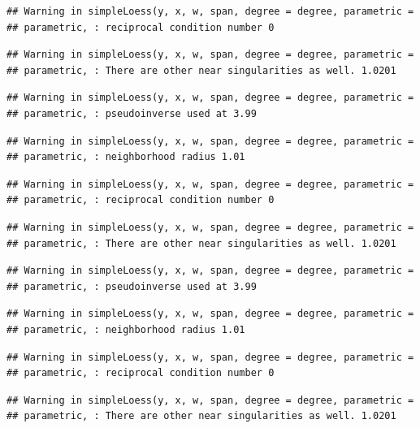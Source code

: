 \documentclass[
]{article}
\begin{document}
\begin{verbatim}
## Warning in simpleLoess(y, x, w, span, degree = degree, parametric =
## parametric, : reciprocal condition number 0
\end{verbatim}

\begin{verbatim}
## Warning in simpleLoess(y, x, w, span, degree = degree, parametric =
## parametric, : There are other near singularities as well. 1.0201
\end{verbatim}

\begin{verbatim}
## Warning in simpleLoess(y, x, w, span, degree = degree, parametric =
## parametric, : pseudoinverse used at 3.99
\end{verbatim}

\begin{verbatim}
## Warning in simpleLoess(y, x, w, span, degree = degree, parametric =
## parametric, : neighborhood radius 1.01
\end{verbatim}

\begin{verbatim}
## Warning in simpleLoess(y, x, w, span, degree = degree, parametric =
## parametric, : reciprocal condition number 0
\end{verbatim}

\begin{verbatim}
## Warning in simpleLoess(y, x, w, span, degree = degree, parametric =
## parametric, : There are other near singularities as well. 1.0201
\end{verbatim}

\begin{verbatim}
## Warning in simpleLoess(y, x, w, span, degree = degree, parametric =
## parametric, : pseudoinverse used at 3.99
\end{verbatim}

\begin{verbatim}
## Warning in simpleLoess(y, x, w, span, degree = degree, parametric =
## parametric, : neighborhood radius 1.01
\end{verbatim}

\begin{verbatim}
## Warning in simpleLoess(y, x, w, span, degree = degree, parametric =
## parametric, : reciprocal condition number 0
\end{verbatim}

\begin{verbatim}
## Warning in simpleLoess(y, x, w, span, degree = degree, parametric =
## parametric, : There are other near singularities as well. 1.0201
\end{verbatim}
\end{document}
